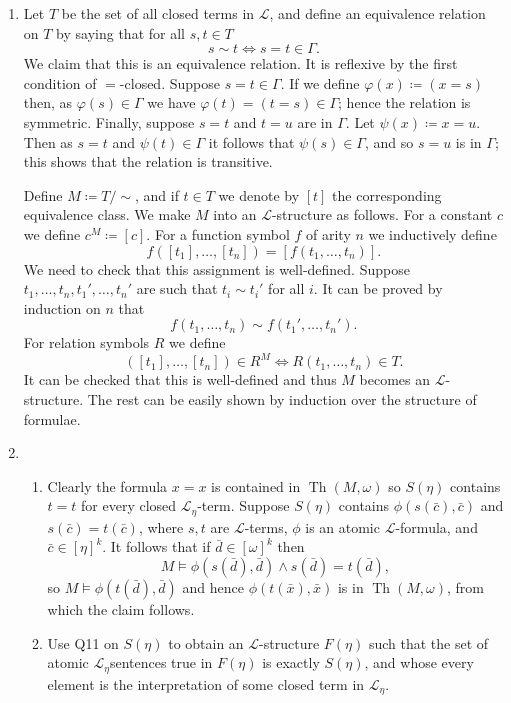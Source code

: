 \documentclass{article}
\theoremstyle{theorem}
\DeclareMathOperator{\Th}{Th}
\begin{document}
\begin{enumerate}[leftmargin=*]
		\item Let $T$ be the set of all closed terms in $\mathcal{L}$, and define an equivalence relation on $T$ by saying that for all $s,t\in T$
		\[
			s\sim t \iff s=t \in \Gamma.
		\]
		We claim that this is an equivalence relation. It is reflexive by the first condition of $=$-closed. Suppose $s=t\in \Gamma$. If we define $\varphi(x)\coloneqq (x=s)$ then, as $\varphi(s) \in \Gamma$ we have $\varphi(t) = (t=s)\in \Gamma$; hence the relation is symmetric. Finally, suppose $s=t$ and $t = u$ are in $\Gamma$. Let $\psi(x)\coloneqq x = u$. Then as $s = t$ and $\psi(t)\in \Gamma$ it follows that $\psi(s)\in \Gamma$, and so $s=u$ is in $\Gamma$; this shows that the relation is transitive.
		
		Define $M\coloneqq T/{\sim}$, and if $t\in T$ we denote by $[t]$ the corresponding equivalence class. We make $M$ into an $\mathcal{L}$-structure as follows. For a constant $c$ we define $c^M \coloneqq [c]$. For a function symbol $f$ of arity $n$ we inductively define
		\[	
			f([t_1],\ldots,[t_n]) = [f(t_1,\ldots,t_n)].
		\]
		We need to check that this assignment is well-defined. Suppose $t_1,\ldots,t_n,t_1',\ldots,t_n'$ are such that $t_i\sim t_i'$ for all $i$. It can be proved by induction on $n$ that 
		\[
			f(t_1,\ldots,t_n) \sim f(t_1',\ldots,t_n').
		\]	
		For relation symbols $R$ we define
		\[
			([t_1],\ldots,[t_n])\in R^M  \iff R(t_1,\ldots,t_n)\in T.
		\] 
		It can be checked that this is well-defined and thus $M$ becomes an $\mathcal{L}$-structure. The rest can be easily shown by induction over the structure of formulae.
		
		\item \leavevmode
		\begin{enumerate}
			\item Clearly the formula $x=x$ is contained in $\Th(M,\omega)$ so $S(\eta)$ contains $t=t$ for every closed $\mathcal{L}_{\eta}$-term. Suppose $S(\eta)$ contains $\phi(s(\bar{c}), \bar{c})$ and $s(\bar{c}) = t(\bar{c})$, where $s,t$ are $\mathcal{L}$-terms, $\phi$ is an atomic $\mathcal{L}$-formula, and $\bar{c}\in [\eta]^k$. It follows that if $\bar{d} \in [\omega]^k$ then 
			\[
				M \models \phi(s(\bar{d}),\bar{d}) \wedge s(\bar{d}) = t(\bar{d}),
			\]
			so $M\models \phi(t(\bar{d}),\bar{d})$ and hence $\phi(t(\bar{x}), \bar{x})$ is in $\Th(M,\omega)$, from which the claim follows.
			\item Use Q11 on $S(\eta)$ to obtain an $\mathcal{L}$-structure $F(\eta)$ such that the set of atomic $\mathcal{L}_\eta$sentences true in $F(\eta)$ is exactly $S(\eta)$, and whose every element is the interpretation of some closed term in $\mathcal{L}_{\eta}$.
			

\end{enumerate}
\end{enumerate}
\end{document}
